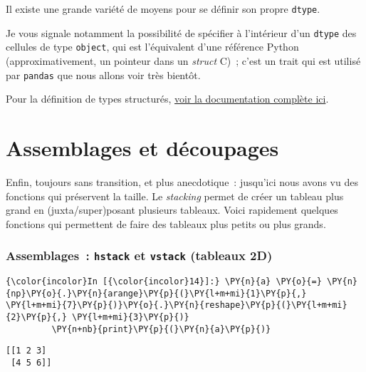     Il existe une grande variété de moyens pour se définir son propre
\texttt{dtype}.

Je vous signale notamment la possibilité de spécifier à l'intérieur d'un
\texttt{dtype} des cellules de type \texttt{object}, qui est
l'équivalent d'une référence Python (approximativement, un pointeur dans
un \emph{struct} C)~; c'est un trait qui est utilisé par \texttt{pandas}
que nous allons voir très bientôt.

Pour la définition de types structurés,
\href{https://docs.scipy.org/doc/numpy-1.13.0/user/basics.rec.html\#defining-structured-arrays}{voir
la documentation complète ici}.

    \hypertarget{assemblages-et-duxe9coupages}{%
\section{Assemblages et découpages}\label{assemblages-et-duxe9coupages}}

    Enfin, toujours sans transition, et plus anecdotique~: jusqu'ici nous
avons vu des fonctions qui préservent la taille. Le \emph{stacking}
permet de créer un tableau plus grand en (juxta/super)posant plusieurs
tableaux. Voici rapidement quelques fonctions qui permettent de faire
des tableaux plus petits ou plus grands.

    \hypertarget{assemblages-hstack-et-vstack-tableaux-2d}{%
\subsubsection{\texorpdfstring{Assemblages~: \texttt{hstack} et
\texttt{vstack} (tableaux
2D)}{Assemblages~: hstack et vstack (tableaux 2D)}}\label{assemblages-hstack-et-vstack-tableaux-2d}}

    \begin{Verbatim}[commandchars=\\\{\}]
{\color{incolor}In [{\color{incolor}14}]:} \PY{n}{a} \PY{o}{=} \PY{n}{np}\PY{o}{.}\PY{n}{arange}\PY{p}{(}\PY{l+m+mi}{1}\PY{p}{,} \PY{l+m+mi}{7}\PY{p}{)}\PY{o}{.}\PY{n}{reshape}\PY{p}{(}\PY{l+m+mi}{2}\PY{p}{,} \PY{l+m+mi}{3}\PY{p}{)}
         \PY{n+nb}{print}\PY{p}{(}\PY{n}{a}\PY{p}{)}
\end{Verbatim}


    \begin{Verbatim}[commandchars=\\\{\}]
[[1 2 3]
 [4 5 6]]

    \end{Verbatim}

